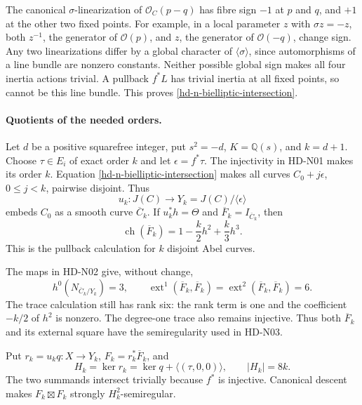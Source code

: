 The canonical $\sigma$-linearization of $\mathcal O_C(p-q)$ has
fibre sign $-1$ at $p$ and $q$, and $+1$ at the other two fixed points.
For example, in a local parameter $z$ with $\sigma z=-z$, both
$z^{-1}$, the generator of $\mathcal O(p)$, and $z$, the generator of
$\mathcal O(-q)$, change sign. Any two linearizations differ by a
global character of $\langle\sigma\rangle$, since automorphisms of a
line bundle are nonzero constants. Neither possible global sign makes
all four inertia actions trivial. A pullback $f^*L$ has trivial
inertia at all fixed points, so cannot be this line bundle. This proves
\eqref{hd-n-bielliptic-intersection}.

\paragraph{Quotients of the needed orders.}
Let $d$ be a positive squarefree integer, put $s^2=-d$, $K=\mathbb Q(s)$,
and $k=d+1$. Choose $\tau\in E_i$ of exact order $k$ and let
$\epsilon=f^*\tau$. The injectivity in HD-N01 makes its order $k$.
Equation \eqref{hd-n-bielliptic-intersection} makes all curves
$C_0+j\epsilon$, $0\le j<k$, pairwise disjoint. Thus
\[
 u_k:J(C)\to Y_k=J(C)/\langle\epsilon\rangle
\]
embeds $C_0$ as a smooth curve $\overline C_k$. If $u_k^*h=\Theta$ and
$\overline F_k=I_{\overline C_k}$, then
\begin{equation}\label{hd-n-general-ideal}
 \operatorname{ch}(\overline F_k)
 =1-\frac{k}{2}h^2+\frac{k}{3}h^3.
\end{equation}
This is the pullback calculation for $k$ disjoint Abel curves.

The maps in HD-N02 give, without change,
\[h^0(N_{\overline C_k/Y_k})=3,\qquad
\operatorname{ext}^1(\overline F_k,\overline F_k)
=\operatorname{ext}^2(\overline F_k,\overline F_k)=6.\]
The trace calculation still has rank six: the rank term is one and
the coefficient $-k/2$ of $h^2$ is nonzero. The degree-one trace also
remains injective. Thus both $\overline F_k$ and its external square
have the semiregularity used in HD-N03.

Put $r_k=u_kq:X\to Y_k$, $F_k=r_k^*\overline F_k$, and
\[
 H_k=\ker r_k=\ker q+\langle(\tau,0,0)\rangle,
 \qquad |H_k|=8k.
\]
The two summands intersect trivially because $f^*$ is injective.
Canonical descent makes $F_k\boxtimes F_k$ strongly
$H_k^2$-semiregular.

